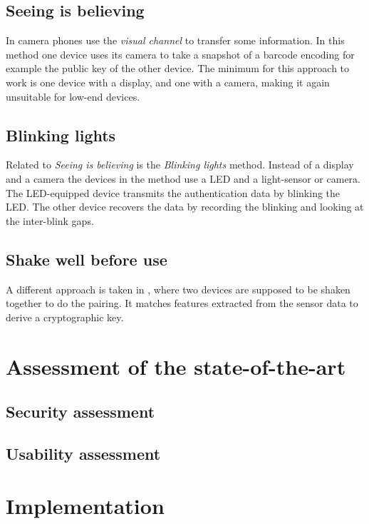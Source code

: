\documentclass[conference, 11pt]{sty/IEEEtran}
\begin{document}
\subsection{Seeing is believing}
In \cite{mccune2005seeing} camera phones use the \textit{visual channel} to transfer some information.
In this method one device uses its camera to take a snapshot of a barcode encoding for example the public key of the other device.
The minimum for this approach to work is one device with a display, and one with a camera, making it again unsuitable for low-end devices.

\subsection{Blinking lights}
Related to \textit{Seeing is believing} is the \textit{Blinking lights} method.
Instead of a display and a camera the devices in the method use a LED and a light-sensor or camera.
The LED-equipped device transmits the authentication data by blinking the LED.
The other device recovers the data by recording the blinking and looking at the inter-blink gaps.

\subsection{Shake well before use}
A different approach is taken in \cite{mayrhofer2009shake}, where two devices are supposed to be shaken together to do the pairing.
It matches features extracted from the sensor data to derive a cryptographic key.

\section{Assessment of the state-of-the-art}
\label{sec:assessment_of_the_state_of_the_art}

\subsection{Security assessment}
\label{ssec:security_assessment}

\subsection{Usability assessment}
\label{ssec:usability_assessment}

\section{Implementation}
\label{sec:implementation}
\end{document}
